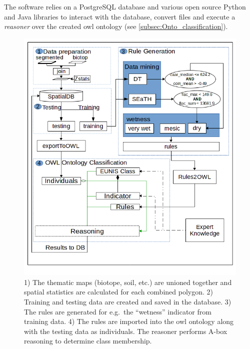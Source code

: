 \documentclass[authoryear,review,12pt,number]{elsarticle}
\begin{document}
The software relies on a PostgreSQL database and various open source Python and 
Java libraries to interact with the database, convert files and execute a 
\textit{reasoner} over the created \gls{owl} ontology (see 
\ref{subsec:Onto_classification}). 
\begin{figure}
\includegraphics[width=1\linewidth]{diagrams/final_workflow_diagram.png}
\caption
    {
        1) The thematic maps (biotope, soil, etc.) are unioned together and
        spatial statistics are calculated for each combined polygon.
        2) Training and testing data are created and saved in the database.
        3) The rules are generated for e.g.\ the ``wetness'' indicator from
        training data.
        4) The rules are imported into the \gls{owl} ontology along with the 
testing
        data as individuals. The reasoner performs A-box reasoning to determine
        class membership.
    \label{fig:full_workflow}}
\end{figure}

\end{document}

